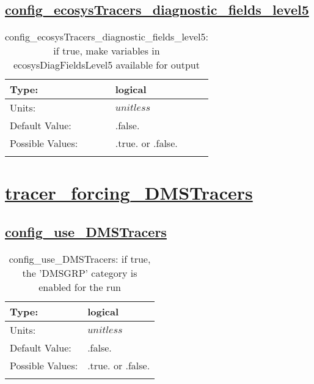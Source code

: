 \subsection[config\_ecosysTracers\_diagnostic\_fields\_level5]{\hyperref[sec:nm_tab_tracer_forcing_ecosysTracers]{config\_ecosysTracers\_diagnostic\_fields\_level5}}
\label{subsec:nm_sec_config_ecosysTracers_diagnostic_fields_level5}
\begin{center}
\begin{longtable}{| p{2.0in} || p{4.0in} |}
    \hline
    Type: & logical \\
    \hline
    Units: & $unitless$ \\
    \hline
    Default Value: & .false. \\
    \hline
    Possible Values: & .true. or .false. \\
    \hline
    \caption{config\_ecosysTracers\_diagnostic\_fields\_level5: if true, make variables in ecosysDiagFieldsLevel5 available for output}
\end{longtable}
\end{center}
\section[tracer\_forcing\_DMSTracers]{\hyperref[sec:nm_tab_tracer_forcing_DMSTracers]{tracer\_forcing\_DMSTracers}}
\label{sec:nm_sec_tracer_forcing_DMSTracers}
\subsection[config\_use\_DMSTracers]{\hyperref[sec:nm_tab_tracer_forcing_DMSTracers]{config\_use\_DMSTracers}}
\label{subsec:nm_sec_config_use_DMSTracers}
\begin{center}
\begin{longtable}{| p{2.0in} || p{4.0in} |}
    \hline
    Type: & logical \\
    \hline
    Units: & $unitless$ \\
    \hline
    Default Value: & .false. \\
    \hline
    Possible Values: & .true. or .false. \\
    \hline
    \caption{config\_use\_DMSTracers: if true, the 'DMSGRP' category is enabled for the run}
\end{longtable}
\end{center}
